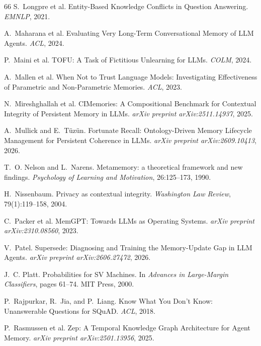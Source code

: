 \documentclass{article}
\begin{document}
\begin{thebibliography}{66}
S.~Longpre et al. Entity-Based Knowledge Conflicts in Question Answering. \emph{EMNLP}, 2021.

A.~Maharana et al. Evaluating Very Long-Term Conversational Memory of LLM Agents. \emph{ACL}, 2024.

P.~Maini et al. TOFU: A Task of Fictitious Unlearning for LLMs. \emph{COLM}, 2024.

A.~Mallen et al. When Not to Trust Language Models: Investigating Effectiveness of Parametric and Non-Parametric Memories. \emph{ACL}, 2023.

N.~Mireshghallah et al. CIMemories: A Compositional Benchmark for Contextual Integrity of Persistent Memory in LLMs. \emph{arXiv preprint arXiv:2511.14937}, 2025.

A.~Mullick and E.~T{\"u}z{\"u}n. Fortunate Recall: Ontology-Driven Memory Lifecycle Management for Persistent Coherence in LLMs. \emph{arXiv preprint arXiv:2609.10413}, 2026.

T.~O. Nelson and L.~Narens. Metamemory: a theoretical framework and new findings. \emph{Psychology of Learning and Motivation}, 26:125--173, 1990.

H.~Nissenbaum. Privacy as contextual integrity. \emph{Washington Law Review}, 79(1):119--158, 2004.

C.~Packer et al. MemGPT: Towards LLMs as Operating Systems. \emph{arXiv preprint arXiv:2310.08560}, 2023.

V.~Patel. Supersede: Diagnosing and Training the Memory-Update Gap in LLM Agents. \emph{arXiv preprint arXiv:2606.27472}, 2026.

J.~C. Platt. Probabilities for SV Machines. In \emph{Advances in Large-Margin Classifiers}, pages 61--74. MIT Press, 2000.

P.~Rajpurkar, R.~Jia, and P.~Liang. Know What You Don't Know: Unanswerable Questions for SQuAD. \emph{ACL}, 2018.

P.~Rasmussen et al. Zep: A Temporal Knowledge Graph Architecture for Agent Memory. \emph{arXiv preprint arXiv:2501.13956}, 2025.


\end{thebibliography}
\end{document}
